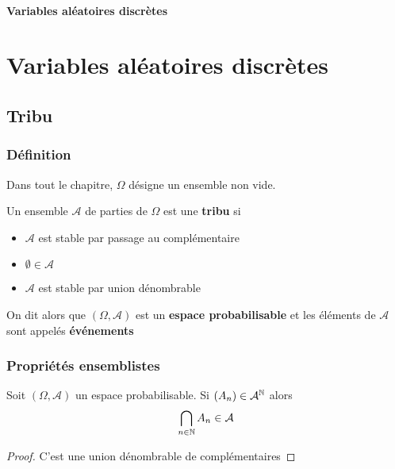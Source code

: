 \ifsolo
    ~

    \vspace{1cm}

    \begin{center}
        \textbf{\LARGE Variables aléatoires discrètes} \\[1em]
    \end{center}
    \tableofcontents
\else
    \chapter{Variables aléatoires discrètes}

    \minitoc
\fi
\thispagestyle{empty}

\section{Tribu}
\subsection{Définition}

Dans tout le chapitre, $\Omega$ désigne un ensemble non vide.

\begin{dfn}
    Un ensemble $\mathcal A$ de parties de $\Omega$ est une \textbf{tribu} si \begin{itemize}
        \item $ \mathcal A$ est stable par passage au complémentaire
        \item $\emptyset \in \mathcal A$
        \item $ \mathcal A$ est stable par union dénombrable
    \end{itemize}
    On dit alors que $(\Omega, \mathcal A)$ est un \textbf{espace probabilisable}  et les éléments de $\mathcal A$ sont appelés  \textbf{événements} 
\end{dfn}


\subsection{Propriétés ensemblistes}

\begin{prop}
    Soit $(\Omega, \mathcal A)$ un espace probabilisable. Si $(A_n)\in \mathcal A^{\mathbb N}$ alors \[
        \bigcap_{n\in\mathbb N}A_n \in \mathcal A
    \]
\end{prop}

\begin{proof}
    C'est une union dénombrable de complémentaires
\end{proof}

